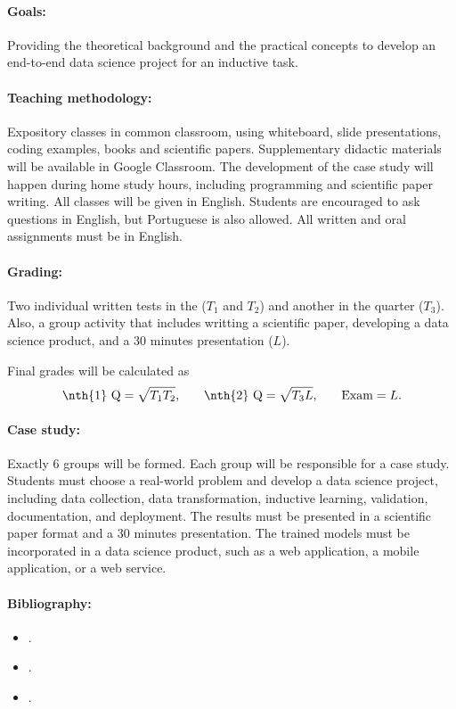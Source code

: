 \paragraph{Goals:}
Providing the theoretical background and the practical concepts to develop an end-to-end
data science project for an inductive task.

\paragraph{Teaching methodology:}
Expository classes in common classroom, using whiteboard, slide presentations, coding
examples, books and scientific papers. Supplementary didactic materials will be available
in Google Classroom. The development of the case study will happen during home study
hours, including programming and scientific paper writing.  All classes will be given in
English.  Students are encouraged to ask questions in English, but Portuguese is also
allowed. All written and oral assignments must be in English.

\paragraph{Grading:} Two individual written tests in the  ($T_1$ and $T_2$) and
another in the  quarter ($T_3$).  Also, a group activity that includes writting a
scientific paper, developing a data science product, and a 30 minutes presentation ($L$).

Final grades will be calculated as
\begin{equation*}
  \text{\nth{1} Q} = \sqrt{T_1 T_2}\text{,} \qquad
  \text{\nth{2} Q} = \sqrt{T_3 L}\text{,} \qquad
  \text{Exam} = L\text{.}
\end{equation*}

\paragraph{Case study:} Exactly 6 groups will be formed.  Each group will be responsible for
a case study.  Students must choose a real-world problem and develop a data science
project, including data collection, data transformation, inductive learning, validation,
documentation, and deployment.  The results must be presented in a scientific paper
format and a 30 minutes presentation.  The trained models must be incorporated in a
data science product, such as a web application, a mobile application, or a web service.

\paragraph{Bibliography:}
\begin{itemize}
  \itemsep 0pt
  \item {}.
  \item {}.
  \item {}.
\end{itemize}

